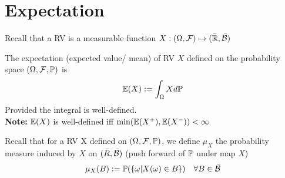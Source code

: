\newpage
\section{Expectation}
Recall that a RV is a measurable function $X:(\Omega, \mathcal{F})\mapsto (\bar{\mathbb{R}}, \bar{\mathcal{B}})$
\begin{dfn}[Expectation] The expectation (expected value/ mean) of RV $X$ defined on the probability space $(\Omega, \mathcal{F}, \mathbb{P})$ is \begin{equation*}
    \mathbb{E}(X) := \int_{\Omega} X d\mathbb{P}
\end{equation*}
Provided the integral is well-defined. \\
\textbf{Note:} $\mathbb{E}(X)$ is well-defined iff $\min(\mathbb{E}(X^+), \mathbb{E}(X^-)) < \infty$
\end{dfn}
Recall that for a RV X defined on $(\Omega, \mathcal{F}, \mathbb{P})$, we define $\mu_X$ the probability measure induced by $X$ on $(\bar{R}, \bar{\mathcal{B}})$ (push forward of $\mathbb{P}$ under map $X$)
\begin{equation*}
    \mu_X(B) := \mathbb{P}(\{\omega| X(\omega) \in B\}) \quad \forall B \in \bar{\mathcal{B}}
\end{equation*}

